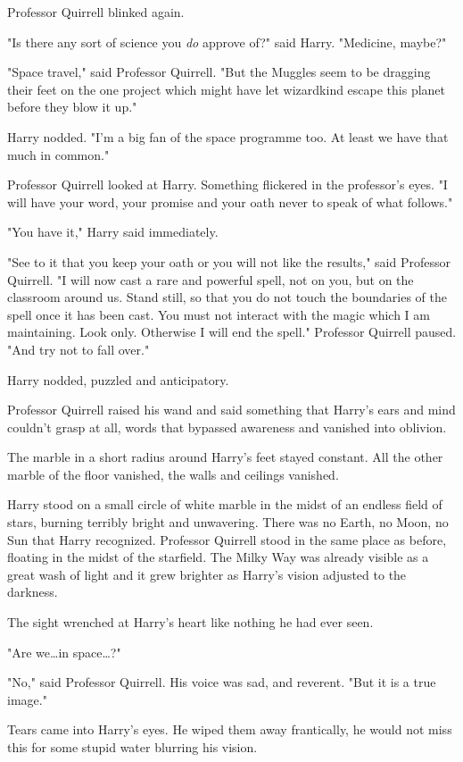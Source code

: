 Professor Quirrell blinked again.

"Is there any sort of science you \emph{do} approve of?" said Harry. "Medicine,
maybe?"

"Space travel," said Professor Quirrell. "But the Muggles seem to be dragging
their feet on the one project which might have let wizardkind escape this
planet before they blow it up."

Harry nodded. "I'm a big fan of the space programme too. At least we have that
much in common."

Professor Quirrell looked at Harry. Something flickered in the professor's
eyes. "I will have your word, your promise and your oath never to speak of what
follows."

"You have it," Harry said immediately.

"See to it that you keep your oath or you will not like the results," said
Professor Quirrell. "I will now cast a rare and powerful spell, not on you, but
on the classroom around us. Stand still, so that you do not touch the
boundaries of the spell once it has been cast. You must not interact with the
magic which I am maintaining. Look only. Otherwise I will end the spell."
Professor Quirrell paused. "And try not to fall over."

Harry nodded, puzzled and anticipatory.

Professor Quirrell raised his wand and said something that Harry's ears and
mind couldn't grasp at all, words that bypassed awareness and vanished into
oblivion.

The marble in a short radius around Harry's feet stayed constant. All the other
marble of the floor vanished, the walls and ceilings vanished.

Harry stood on a small circle of white marble in the midst of an endless field
of stars, burning terribly bright and unwavering. There was no Earth, no Moon,
no Sun that Harry recognized. Professor Quirrell stood in the same place as
before, floating in the midst of the starfield. The Milky Way was already
visible as a great wash of light and it grew brighter as Harry's vision
adjusted to the darkness.

The sight wrenched at Harry's heart like nothing he had ever seen.

"Are we…in space…?"

"No," said Professor Quirrell. His voice was sad, and reverent. "But it is a
true image."

Tears came into Harry's eyes. He wiped them away frantically, he would not miss
this for some stupid water blurring his vision.

